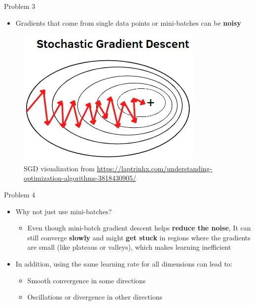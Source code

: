 \documentclass[serif, aspectratio=169]{beamer}
\begin{document}
\begin{frame}{Problem 3}
    \begin{minipage}{0.4\textwidth}
        \begin{itemize}
        \item Gradients that come from single data points or mini-batches can be \textbf{noisy}
        \end{itemize}
    \end{minipage}%
    \begin{minipage}{0.6\textwidth}
        \centering
        \begin{figure}
            \centering
            \includegraphics[width=0.6\linewidth]{pic/sgd_mlexplained.png}
            \caption{\footnotesize SGD visualization from \url{https://laptrinhx.com/understanding-optimization-algorithms-3818430905/}}
        \end{figure}
    \end{minipage}
\end{frame}

\begin{frame}{Problem 4}
    \begin{itemize}
        \item Why not just use mini-batches?
        \begin{itemize}
            \item Even though mini-batch gradient descent helps \textbf{reduce the noise}, It can still converge \textbf{slowly} and might \textbf{get stuck} in regions where the gradients are small (like plateaus or valleys), which makes learning inefficient
        \end{itemize}
        \item In addition, using the same learning rate for all dimensions can lead to:
        \begin{itemize}
            \item Smooth convergence in some directions
            \item Oscillations or divergence in other directions
        \end{itemize}
    \end{itemize}
\end{frame}
\end{document}
